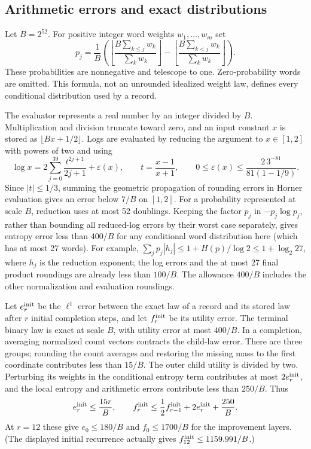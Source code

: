 \subsection{Arithmetic errors and exact distributions}

Let $B=2^{52}$.  For positive integer word weights $w_1,\ldots,w_m$ set
\begin{equation}
 p_j=\frac1B\left(
  \left\lfloor\frac{B\sum_{k\le j}w_k}{\sum_kw_k}\right\rfloor-
  \left\lfloor\frac{B\sum_{k<j}w_k}{\sum_kw_k}\right\rfloor\right).
 \label{cert:w-cumulative}
\end{equation}
These probabilities are nonnegative and telescope to one.  Zero-probability
words are omitted.  This formula, not an unrounded idealized weight law,
defines every conditional distribution used by a record.

The evaluator represents a real number by an integer divided by $B$.
Multiplication and division truncate toward zero, and an input constant
$x$ is stored as $\lfloor Bx+1/2\rfloor$.  Logs are evaluated by reducing
the argument to $x\in[1,2]$ with powers of two and using
\begin{equation}
 \log x=2\sum_{j=0}^{39}\frac{t^{2j+1}}{2j+1}
                  +\varepsilon(x),\qquad
 t=\frac{x-1}{x+1},\qquad
 0\le\varepsilon(x)\le\frac{2\,3^{-81}}{81(1-1/9)}.
 \label{cert:w-log-evaluation}
\end{equation}
Since $|t|\le1/3$, summing the geometric propagation of rounding errors
in Horner evaluation gives an error below $7/B$ on $[1,2]$.
For a probability represented at scale $B$, reduction uses at most 52
doublings.  Keeping the factor $p_j$ in $-p_j\log p_j$, rather than
bounding all reduced-log errors by their worst case separately, gives
entropy error less than $400/B$ for any conditional word distribution
here (which has at most 27 words).  For example,
$\sum_jp_j|h_j|\le1+H(p)/\log2\le1+\log_2 27$, where $h_j$ is the
reduction exponent; the log errors and the at most 27 final product
roundings are already less than $100/B$.  The allowance $400/B$ includes
the other normalization and evaluation roundings.

Let $e_r^{\rm init}$ be the $\ell^1$ error between the exact law of a
record and its stored law after $r$ initial completion steps, and let
$f_r^{\rm init}$ be its utility error.  The terminal binary law is exact
at scale $B$, with utility error at most $400/B$.  In a completion,
averaging normalized count vectors contracts the child-law error.
There are three groups; rounding the count averages and restoring the
missing mass to the first coordinate contributes less than $15/B$.
The outer child utility is divided by two.  Perturbing its weights in the
conditional entropy term contributes at most $2e_r^{\rm init}$, and
the local entropy and arithmetic errors contribute less than $250/B$.
Thus
\begin{equation}
 e_r^{\rm init}\le\frac{15r}{B},\qquad
 f_r^{\rm init}\le\frac12 f_{r-1}^{\rm init}
                      +2e_r^{\rm init}+\frac{250}{B}.
 \label{cert:w-initial-errors}
\end{equation}
At $r=12$ these give $e_0\le180/B$ and $f_0\le1700/B$ for the
improvement layers.  (The displayed initial recurrence actually gives
$f_{12}^{\rm init}\le1159.991/B$.)

